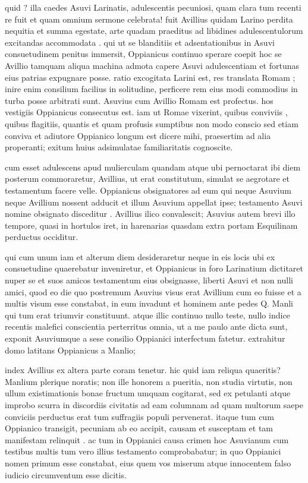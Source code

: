  quid ? illa caedes Asuvi Larinatis, adulescentis pecuniosi, quam clara tum recenti re fuit et quam omnium sermone celebrata! fuit Avillius quidam Larino perdita nequitia et summa egestate, arte quadam praeditus ad libidines adulescentulorum excitandas accommodata . qui ut se blanditiis et adsentationibus in Asuvi consuetudinem penitus immersit, Oppianicus continuo sperare coepit hoc se Avillio tamquam aliqua machina admota capere Asuvi adulescentiam et fortunas eius patrias expugnare posse. ratio excogitata Larini est, res translata Romam ; inire enim consilium facilius in solitudine, perficere rem eius modi commodius in turba posse arbitrati sunt. Asuvius cum Avillio Romam est profectus. hos vestigiis Oppianicus consecutus est. iam ut Romae vixerint, quibus conviviis , quibus flagitiis, quantis et quam profusis sumptibus non modo conscio sed etiam conviva et adiutore Oppianico longum est dicere mihi, praesertim ad alia properanti; exitum huius adsimulatae familiaritatis cognoscite.

 cum esset adulescens apud mulierculam quandam atque ubi pernoctarat ibi diem posterum commoraretur, Avillius, ut erat constitutum, simulat se aegrotare et testamentum facere velle. Oppianicus obsignatores ad eum qui neque Asuvium neque Avillium nossent adducit et illum Asuvium appellat ipse; testamento Asuvi nomine obsignato disceditur . Avillius ilico convalescit; Asuvius autem brevi illo tempore, quasi in hortulos iret, in harenarias quasdam extra portam Esquilinam perductus occiditur.

 qui cum unum iam et alterum diem desideraretur neque in eis locis ubi ex consuetudine quaerebatur inveniretur, et Oppianicus in foro Larinatium dictitaret nuper se et suos amicos testamentum eius obsignasse, liberti Asuvi et non nulli amici, quod eo die quo postremum Asuvius visus erat Avillium cum eo fuisse et a multis visum esse constabat, in eum invadunt et hominem ante pedes Q. Manli qui tum erat triumvir constituunt. atque illic continuo nullo teste, nullo indice recentis malefici conscientia perterritus omnia, ut a me paulo ante dicta sunt, exponit Asuviumque a sese consilio Oppianici interfectum fatetur. extrahitur domo latitans Oppianicus a Manlio;

 index Avillius ex altera parte coram tenetur. hic quid iam reliqua quaeritis? Manlium plerique noratis; non ille honorem a pueritia, non studia virtutis, non ullum existimationis bonae fructum umquam cogitarat, sed ex petulanti atque improbo scurra in discordiis civitatis ad eam columnam ad quam multorum saepe conviciis perductus erat tum suffragiis populi pervenerat. itaque tum cum Oppianico transigit, pecuniam ab eo accipit, causam et susceptam et tam manifestam relinquit . ac tum in Oppianici causa crimen hoc Asuvianum cum testibus multis tum vero illius testamento comprobabatur; in quo Oppianici nomen primum esse constabat, eius quem vos miserum atque innocentem falso iudicio circumventum esse dicitis.

